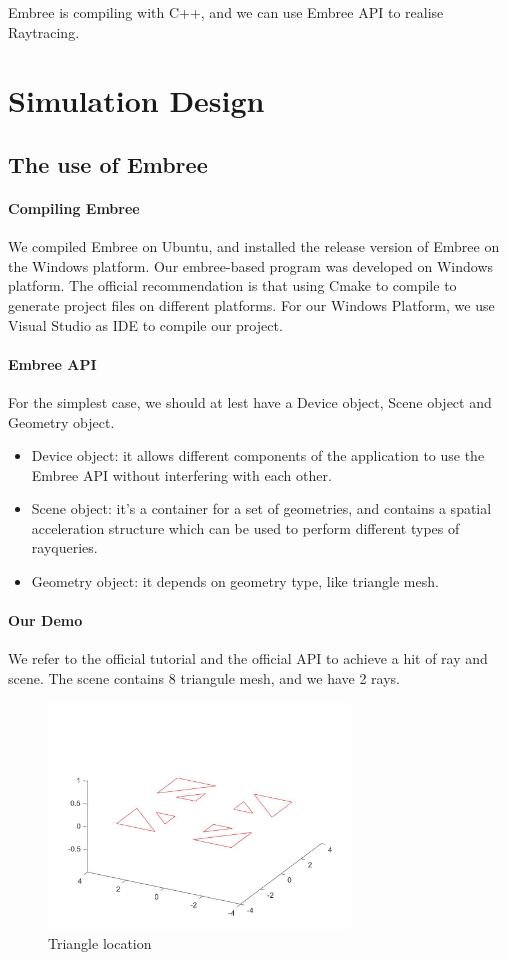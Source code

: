 \documentclass[conference]{IEEEtran}
\begin{document}
Embree is compiling with C++, and we can use Embree API to realise Raytracing.

\section{Simulation Design}

\subsection{The use of Embree}
\paragraph{Compiling Embree}
We compiled Embree on Ubuntu, and installed the release version of Embree on the Windows platform. Our embree-based program was developed on Windows platform. The official recommendation is that using Cmake to compile to generate project files on different platforms. For our Windows Platform, we use Visual Studio as IDE to compile our project.
\paragraph{Embree API}
For the simplest case, we should at lest have a Device object, Scene object and Geometry object. 
\begin{itemize}
    \item Device object: it allows different components of the application to use the Embree API without interfering with each other. 
    \item Scene object: it's a container for a set of geometries, and contains a spatial acceleration structure which can be used to perform different types of rayqueries.
    \item Geometry object: it depends on geometry type, like triangle mesh. 
\end{itemize}
\paragraph{Our Demo}
We refer to the official tutorial and the official API to achieve a hit of ray and scene. The scene contains 8 triangule mesh, and we have 2 rays.
\begin{figure}[ht]
    \caption{Triangle location}
    \label{Triangle_Location}
    \centering 
    \includegraphics[width=8cm]{Triangle_Location.jpg}
\end{figure}
\end{document}
